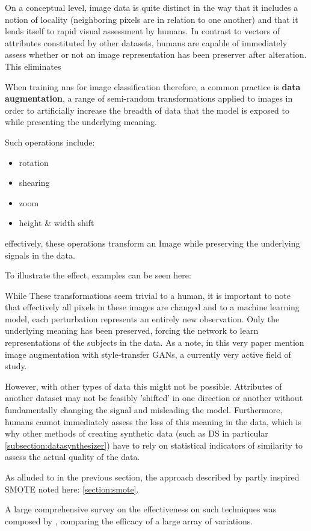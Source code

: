 On a conceptual level, image data is quite distinct in the way that it includes a notion of locality (neighboring pixels are in relation to one another) and that it lends itself to rapid visual assessment by humans. In contrast to vectors of attributes constituted by other datasets, humans are capable of immediately assess whether or not an image representation has been preserver after alteration. This eliminates 

When training \acp{nn} for image classification therefore, a common practice is \textbf{data augmentation}, a range of semi-random transformations applied to images in order to artificially increase the breadth of data that the model is exposed to while presenting the underlying meaning. 

Such operations include:
\begin{itemize}
	\item rotation
	\item shearing
	\item zoom
	\item height \& width shift
\end{itemize}

effectively, these operations transform an Image while preserving the underlying signals in the data. 

\pagebreak

To illustrate the effect, examples can be seen here:


While These transformations seem trivial to a human, it is important to note that effectively all pixels in these images are changed and to a machine learning model, each perturbation represents an entirely new observation. 
Only the underlying meaning has been preserved, forcing the network to learn representations of the subjects in the data. As a note, in this very paper \cite{perez2017effectiveness} mention image augmentation with style-transfer \acp{GAN}, a currently very active field of study.

However, with other types of data this might not be possible. Attributes of another dataset may not be feasibly 'shifted' in one direction or another without fundamentally changing the signal and misleading the model. Furthermore, humans cannot immediately assess the loss of this meaning in the data, which is why other methods of creating synthetic data (such as \ac{DS} in particular \ref{subsection:datasynthesizer}) have to rely on statistical indicators of similarity to assess the actual quality of the data.

As alluded to in the previous section, the approach described by \cite{image_augmentation} partly inspired \ac{SMOTE} noted here: \ref{section:smote}.

A large comprehensive survey on the effectiveness on such techniques was composed by \cite{shorten2019survey}, comparing the efficacy of a large array of variations.
